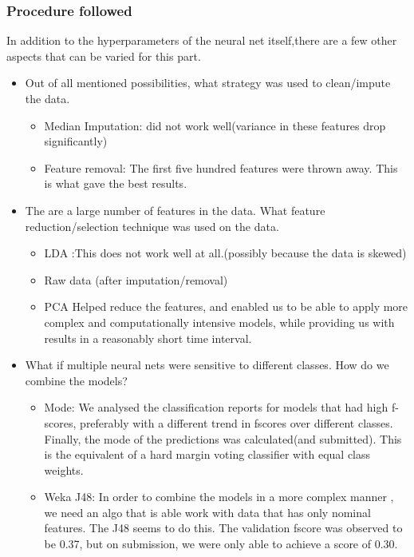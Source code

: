 \documentclass[12pt]{report}
\begin{document}
\subsubsection{Procedure followed}
In addition to the hyperparameters of the neural net itself,there are a few other aspects that can be varied for this part. 
\begin{itemize}
    \item Out of all mentioned possibilities, what strategy was used to clean/impute the data.
    \begin{itemize}
        \item Median Imputation: did not work well(variance in these features drop significantly)
        \item Feature removal: The first five hundred features were thrown away. This is what gave the best results.
    \end{itemize}

    \item The are a large number of features in the data. What feature reduction/selection technique was used on the data.
    \begin{itemize}
        \item LDA :This does not work well at all.(possibly because the data is skewed)
        \item Raw data (after imputation/removal) 
        \item PCA Helped reduce the features, and enabled us to be able to apply more complex and computationally intensive models, while providing us with results in a reasonably short time interval.
    \end{itemize}

    \item What if multiple neural nets were sensitive to different classes. How do we combine the models?
    \begin{itemize}
        \item Mode:  We analysed the classification reports for models that had high f-scores, preferably with a different trend in fscores over different classes. Finally, the mode of the predictions was calculated(and submitted). This is the equivalent of a hard margin voting classifier with equal class weights.
        \item Weka J48: In order to combine the models in a more complex manner , we need an algo that is able work with data that has only nominal features. The J48 seems to do this. The validation fscore was observed to be 0.37, but on submission, we were only able to achieve a score of 0.30. 
        
    \end{itemize}
   
\end{itemize}
\end{document}
